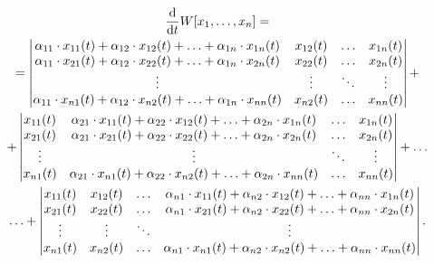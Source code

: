 \begin{multline*}
	\frac{\mathop{}\!\mathrm{d}}{\mathop{}\!\mathrm{d} t} W[x_1, \ldots, x_n] = \\
	= \begin{vmatrix} \alpha_{11} \cdot x_{11} (t) + \alpha_{12} \cdot x_{12}(t) + \ldots + \alpha_{1n} \cdot x_{1n}(t) & x_{12}(t) & \ldots & x_{1n}(t) \\  \alpha_{11} \cdot x_{21} (t) + \alpha_{12} \cdot x_{22}(t) + \ldots + \alpha_{1n} \cdot x_{2n}(t) & x_{22}(t) & \ldots & x_{2n}(t) \\ \vdots & \vdots & \ddots & \vdots \\ \alpha_{11} \cdot x_{n1} (t) + \alpha_{12} \cdot x_{n2}(t) + \ldots + \alpha_{1n} \cdot x_{nn}(t) & x_{n2}(t) & \ldots & x_{nn}(t) \end{vmatrix} + \\
	+ \begin{vmatrix} x_{11}(t) & \alpha_{21} \cdot x_{11} (t) + \alpha_{22} \cdot x_{12}(t) + \ldots + \alpha_{2n} \cdot x_{1n}(t) & \ldots & x_{1n}(t) \\ x_{21}(t) & \alpha_{21} \cdot x_{21} (t) + \alpha_{22} \cdot x_{22}(t) + \ldots + \alpha_{2n} \cdot x_{2n}(t) & \ldots & x_{2n}(t) \\ \vdots & \vdots & \ddots & \vdots \\ x_{n1}(t) & \alpha_{21} \cdot x_{n1} (t) + \alpha_{22} \cdot x_{n2}(t) + \ldots + \alpha_{2n} \cdot x_{nn}(t) & \ldots & x_{nn}(t) \end{vmatrix} + \ldots \\
	\ldots + \begin{vmatrix} x_{11}(t) & x_{12}(t) & \ldots & \alpha_{n1} \cdot x_{11} (t) + \alpha_{n2} \cdot x_{12}(t) + \ldots + \alpha_{nn} \cdot x_{1n}(t) \\ x_{21}(t) & x_{22}(t) & \ldots & \alpha_{n1} \cdot x_{21} (t) + \alpha_{n2} \cdot x_{22}(t) + \ldots + \alpha_{nn} \cdot x_{2n}(t) \\ \vdots & \vdots & \ddots & \vdots \\ x_{n1}(t) & x_{n2}(t) & \ldots & \alpha_{n1} \cdot x_{n1} (t) + \alpha_{n2} \cdot x_{n2}(t) + \ldots + \alpha_{nn} \cdot x_{nn}(t) \end{vmatrix}.
\end{multline*}

